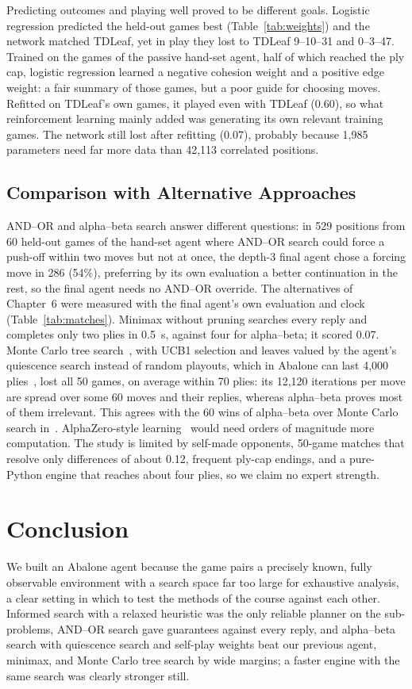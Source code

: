 \documentclass[conference,a4paper]{IEEEtran}
\begin{document}
Predicting outcomes and playing well proved to be different goals. Logistic regression predicted the held-out games best (Table~\ref{tab:weights}) and the network matched TDLeaf, yet in play they lost to TDLeaf 9--10--31 and 0--3--47. Trained on the games of the passive hand-set agent, half of which reached the ply cap, logistic regression learned a negative cohesion weight and a positive edge weight: a fair summary of those games, but a poor guide for choosing moves. Refitted on TDLeaf's own games, it played even with TDLeaf (0.60), so what reinforcement learning mainly added was generating its own relevant training games. The network still lost after refitting (0.07), probably because 1,985 parameters need far more data than 42,113 correlated positions.

\subsection{Comparison with Alternative Approaches}
AND--OR and alpha--beta search answer different questions: in 529 positions from 60 held-out games of the hand-set agent where AND--OR search could force a push-off within two moves but not at once, the depth-3 final agent chose a forcing move in 286 (54\%), preferring by its own evaluation a better continuation in the rest, so the final agent needs no AND--OR override. The alternatives of Chapter~6 were measured with the final agent's own evaluation and clock (Table~\ref{tab:matches}). Minimax without pruning searches every reply and completes only two plies in 0.5~s, against four for alpha--beta; it scored 0.07. Monte Carlo tree search~\cite{russell2021}, with UCB1 selection and leaves valued by the agent's quiescence search instead of random playouts, which in Abalone can last 4,000 plies~\cite{chorus2009}, lost all 50 games, on average within 70 plies: its 12,120 iterations per move are spread over some 60 moves and their replies, whereas alpha--beta proves most of them irrelevant. This agrees with the 60 wins of alpha--beta over Monte Carlo search in~\cite{chorus2009}. AlphaZero-style learning~\cite{silver2018} would need orders of magnitude more computation. The study is limited by self-made opponents, 50-game matches that resolve only differences of about 0.12, frequent ply-cap endings, and a pure-Python engine that reaches about four plies, so we claim no expert strength.

\section{Conclusion}
We built an Abalone agent because the game pairs a precisely known, fully observable environment with a search space far too large for exhaustive analysis, a clear setting in which to test the methods of the course against each other. Informed search with a relaxed heuristic was the only reliable planner on the sub-problems, AND--OR search gave guarantees against every reply, and alpha--beta search with quiescence search and self-play weights beat our previous agent, minimax, and Monte Carlo tree search by wide margins; a faster engine with the same search was clearly stronger still.
\end{document}
